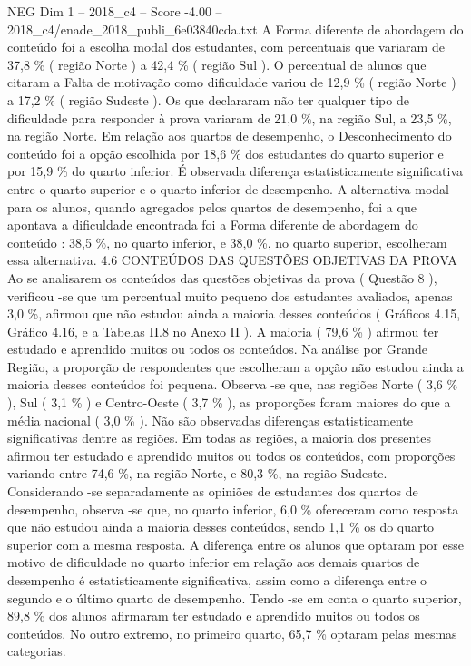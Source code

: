\begin{textsample}{NEG Dim 1 – 2018\_c4 – Score -4.00 – 2018\_c4/enade\_2018\_publi\_6e03840cda.txt}
A Forma diferente de abordagem do conteúdo foi a escolha modal dos estudantes, com percentuais que variaram de 37,8 \% ( região Norte ) a 42,4 \% ( região Sul ).
O percentual de alunos que citaram a Falta de motivação como dificuldade variou de 12,9 \% ( região Norte ) a 17,2 \% ( região Sudeste ).
Os que declararam não ter qualquer tipo de dificuldade para responder à prova variaram de 21,0 \%, na região Sul, a 23,5 \%, na região Norte.
Em relação aos quartos de desempenho, o Desconhecimento do conteúdo foi a opção escolhida por 18,6 \% dos estudantes do quarto superior e por 15,9 \% do quarto inferior.
É observada diferença estatisticamente significativa entre o quarto superior e o quarto inferior de desempenho.
A alternativa modal para os alunos, quando agregados pelos quartos de desempenho, foi a que apontava a dificuldade encontrada foi a Forma diferente de abordagem do conteúdo : 38,5 \%, no quarto inferior, e 38,0 \%, no quarto superior, escolheram essa alternativa. 4.6 CONTEÚDOS DAS QUESTÕES OBJETIVAS DA PROVA Ao se analisarem os conteúdos das questões objetivas da prova ( Questão 8 ), verificou -se que um percentual muito pequeno dos estudantes avaliados, apenas 3,0 \%, afirmou que não estudou ainda a maioria desses conteúdos ( Gráficos 4.15, Gráfico 4.16, e a Tabelas II.8 no Anexo II ).
A maioria ( 79,6 \% ) afirmou ter estudado e aprendido muitos ou todos os conteúdos.
Na análise por Grande Região, a proporção de respondentes que escolheram a opção não estudou ainda a maioria desses conteúdos foi pequena.
Observa -se que, nas regiões Norte ( 3,6 \% ), Sul ( 3,1 \% ) e Centro-Oeste ( 3,7 \% ), as proporções foram maiores do que a média nacional ( 3,0 \% ).
Não são observadas diferenças estatisticamente significativas dentre as regiões.
Em todas as regiões, a maioria dos presentes afirmou ter estudado e aprendido muitos ou todos os conteúdos, com proporções variando entre 74,6 \%, na região Norte, e 80,3 \%, na região Sudeste.
Considerando -se separadamente as opiniões de estudantes dos quartos de desempenho, observa -se que, no quarto inferior, 6,0 \% ofereceram como resposta que não estudou ainda a maioria desses conteúdos, sendo 1,1 \% os do quarto superior com a mesma resposta.
A diferença entre os alunos que optaram por esse motivo de dificuldade no quarto inferior em relação aos demais quartos de desempenho é estatisticamente significativa, assim como a diferença entre o segundo e o último quarto de desempenho.
Tendo -se em conta o quarto superior, 89,8 \% dos alunos afirmaram ter estudado e aprendido muitos ou todos os conteúdos.
No outro extremo, no primeiro quarto, 65,7 \% optaram pelas mesmas categorias.

\end{textsample}
